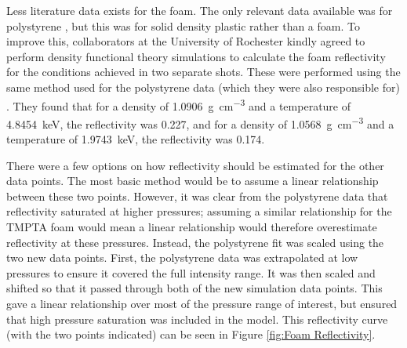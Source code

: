 Less literature data exists for the foam. The only relevant data available was for polystyrene \cite{Hu2014}, but this was for solid density plastic rather than a foam. To improve this, collaborators at the University of Rochester kindly agreed to perform density functional theory simulations to calculate the foam reflectivity for the conditions achieved in two separate shots. These were performed using the same method used for the polystyrene data (which they were also responsible for) \cite{Hu2014, Hu2017}. They found that for a density of 1.0906~\unit{\gram\per\centi\meter\cubed} and a temperature of 4.8454~\unit{\kilo\electronvolt}, the reflectivity was 0.227, and for a density of 1.0568~\unit{\gram\per\centi\meter\cubed} and a temperature of 1.9743~\unit{\kilo\electronvolt}, the reflectivity was 0.174. 

There were a few options on how reflectivity should be estimated for the other data points. The most basic method would be to assume a linear relationship between these two points. However, it was clear from the polystyrene data that reflectivity saturated at higher pressures; assuming a similar relationship for the TMPTA foam would mean a linear relationship would therefore overestimate reflectivity at these pressures. Instead, the polystyrene fit was scaled using the two new data points. First, the polystyrene data was extrapolated at low pressures to ensure it covered the full intensity range. It was then scaled and shifted so that it passed through both of the new simulation data points. This gave a linear relationship over most of the pressure range of interest, but ensured that high pressure saturation was included in the model. This reflectivity curve (with the two points indicated) can be seen in Figure \ref{fig:Foam Reflectivity}.

